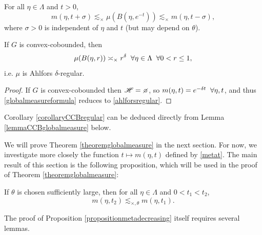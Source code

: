 \begin{theorem}
\label{theoremglobalmeasure}
For all $\eta\in\Lambda$ and $t > 0$,
\begin{equation}
\label{globalmeasureformula}
m(\eta,t + \sigma) \lesssim_\times \mu(B(\eta,e^{-t})) \lesssim_\times m(\eta,t - \sigma),
\end{equation}
where $\sigma > 0$ is independent of $\eta$ and $t$ (but may depend on $\theta$).
\end{theorem}

\begin{corollary}
\label{corollaryCCBregular}
If $G$ is convex-cobounded, then
\begin{equation}
\label{ahlforsregular}
\mu(B(\eta,r)) \asymp_\times r^\delta \;\;\forall \eta\in\Lambda \;\;\forall 0 < r \leq 1,
\end{equation}
i.e. $\mu$ is Ahlfors $\delta$-regular.
\end{corollary}
\begin{proof}
If $G$ is convex-cobounded then $\scrH = \emptyset$, so $m(\eta,t) = e^{-\delta t}\;\;\forall\eta,t$, and thus \eqref{globalmeasureformula} reduces to \eqref{ahlforsregular}.
\end{proof}

\begin{remark}
Corollary \ref{corollaryCCBregular} can be deduced directly from Lemma \ref{lemmaCCBglobalmeasure} below.
\end{remark}

We will prove Theorem \ref{theoremglobalmeasure} in the next section. For now, we investigate more closely the function $t\mapsto m(\eta,t)$ defined by \eqref{metat}. The main result of this section is the following proposition, which will be used in the proof of Theorem \ref{theoremglobalmeasure}:

\begin{proposition}
\label{propositionmetadecreasing}
If $\theta$ is chosen sufficiently large, then for all $\eta\in\Lambda$ and $0 < t_1 < t_2$,
\begin{equation}
\label{metadecreasing}
m(\eta,t_2) \lesssim_{\times,\theta} m(\eta,t_1).
\end{equation}
\end{proposition}

The proof of Proposition \ref{propositionmetadecreasing} itself requires several lemmas.

